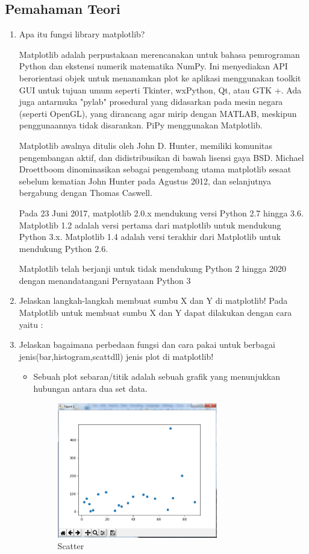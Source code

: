 \subsection{Pemahaman Teori}
\begin{enumerate}
\item Apa itu fungsi library matplotlib?
\par
Matplotlib adalah perpustakaan merencanakan untuk bahasa pemrograman Python dan ekstensi numerik matematika NumPy. Ini menyediakan API berorientasi objek untuk menanamkan plot ke aplikasi menggunakan toolkit GUI untuk tujuan umum seperti Tkinter, wxPython, Qt, atau GTK +. Ada juga antarmuka "pylab" prosedural yang didasarkan pada mesin negara (seperti OpenGL), yang dirancang agar mirip dengan MATLAB, meskipun penggunaannya tidak disarankan. PiPy menggunakan Matplotlib.
\par
Matplotlib awalnya ditulis oleh John D. Hunter, memiliki komunitas pengembangan aktif, dan didistribusikan di bawah lisensi gaya BSD. Michael Droettboom dinominasikan sebagai pengembang utama matplotlib sesaat sebelum kematian John Hunter pada Agustus 2012, dan selanjutnya bergabung dengan Thomas Caswell.
\par
Pada 23 Juni 2017, matplotlib 2.0.x mendukung versi Python 2.7 hingga 3.6. Matplotlib 1.2 adalah versi pertama dari matplotlib untuk mendukung Python 3.x. Matplotlib 1.4 adalah versi terakhir dari Matplotlib untuk mendukung Python 2.6.
\par
Matplotlib telah berjanji untuk tidak mendukung Python 2 hingga 2020 dengan menandatangani Pernyataan Python 3

\item Jelaskan langkah-langkah membuat sumbu X dan Y di matplotlib!
Pada Matplotlib untuk membuat sumbu X dan Y dapat dilakukan dengan cara yaitu :


\item Jelaskan bagaimana perbedaan fungsi dan cara pakai untuk berbagai jenis(bar,histogram,scattdll) jenis plot di matplotlib!
\begin{itemize}
\item Sebuah plot sebaran/titik adalah sebuah grafik yang menunjukkan hubungan antara dua set data.

\begin{figure}[H]
\centering
\includegraphics[width=7cm]{figures/6/1174050/Teori/3scatter.png}
\caption{Scatter}
\end{figure}


\end{itemize}
\end{enumerate}
